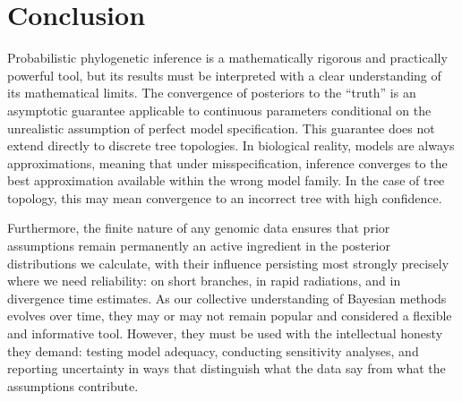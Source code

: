 \section{Conclusion}

Probabilistic phylogenetic inference is a mathematically rigorous and practically powerful tool, but its results must be interpreted with a clear understanding of its mathematical limits. The convergence of posteriors to the ``truth'' is an asymptotic guarantee applicable to continuous parameters conditional on the unrealistic assumption of perfect model specification. This guarantee does not extend directly to discrete tree topologies. In biological reality, models are always approximations, meaning that under misspecification, inference converges to the best approximation available within the wrong model family. In the case of tree topology, this may mean convergence to an incorrect tree with high confidence.

Furthermore, the finite nature of any genomic data ensures that prior assumptions remain permanently an active ingredient in the posterior distributions we calculate, with their influence persisting most strongly precisely where we need reliability: on short branches, in rapid radiations, and in divergence time estimates. As our collective understanding of Bayesian methods evolves over time, they may or may not remain popular and considered a flexible and informative tool. However, they must be used with the intellectual honesty they demand: testing model adequacy, conducting sensitivity analyses, and reporting uncertainty in ways that distinguish what the data say from what the assumptions contribute.

